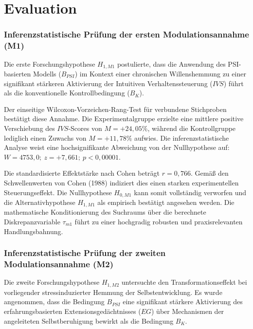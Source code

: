 \chapter{Evaluation}

\subsection{Inferenzstatistische Prüfung der ersten Modulationsannahme (M1)}

Die erste Forschungshypothese $H_{1, M1}$ postulierte, dass die Anwendung des PSI-basierten Modells ($B_{PSI}$) im Kontext einer chronischen Willenshemmung zu einer signifikant stärkeren Aktivierung der Intuitiven Verhaltenssteuerung ($IVS$) führt als die konventionelle Kontrollbedingung ($B_K$). 

Der einseitige Wilcoxon-Vorzeichen-Rang-Test für verbundene Stichproben bestätigt diese Annahme. Die Experimentalgruppe erzielte eine mittlere positive Verschiebung des $IVS$-Scores von $M = +24{,}05\%$, während die Kontrollgruppe lediglich einen Zuwachs von $M = +11{,}78\%$ aufwies. Die inferenzstatistische Analyse weist eine hochsignifikante Abweichung von der Nullhypothese auf:
\begin{math}
    W = 4753{,}0; \ z = +7{,}661; \ p < 0{,}00001
\end{math}.

Die standardisierte Effektstärke nach Cohen beträgt $r = 0{,}766$. Gemäß den Schwellenwerten von Cohen (1988) indiziert dies einen starken experimentellen Steuerungseffekt. Die Nullhypothese $H_{0, M1}$ kann somit vollständig verworfen und die Alternativhypothese $H_{1, M1}$ als empirisch bestätigt angesehen werden. Die mathematische Konditionierung des Suchraums über die berechnete Diskrepanzvariable $\tau_{m1}$ führt zu einer hochgradig robusten und praxisrelevanten Handlungsbahnung.

\subsection{Inferenzstatistische Prüfung der zweiten Modulationsannahme (M2)}

Die zweite Forschungshypothese $H_{1, M2}$ untersuchte den Transformationseffekt bei vorliegender stressinduzierter Hemmung der Selbstentwicklung. Es wurde angenommen, dass die Bedingung $B_{PSI}$ eine signifikant stärkere Aktivierung des erfahrungsbasierten Extensionsgedächtnisses ($EG$) über Mechanismen der angeleiteten Selbstberuhigung bewirkt als die Bedingung $B_K$.

